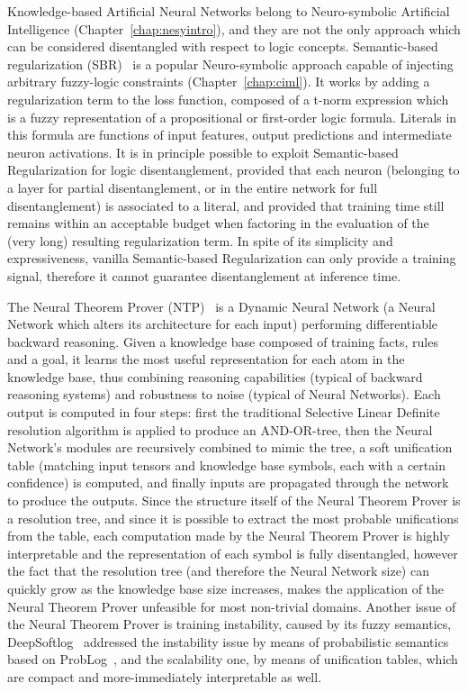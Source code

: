 Knowledge-based Artificial Neural Networks belong to Neuro-symbolic Artificial Intelligence (Chapter~\ref{chap:nesyintro}), and they are not the only approach which can be considered disentangled with respect to logic concepts.
%
Semantic-based regularization (SBR)~\cite{diligenti2017semantic} is a popular Neuro-symbolic approach capable of injecting arbitrary fuzzy-logic constraints (Chapter~\ref{chap:ciml}). It works by adding a regularization term to the loss function, composed of a t-norm expression which is a fuzzy representation of a propositional or first-order logic formula. Literals in this formula are functions of input features, output predictions and intermediate neuron activations. It is in principle possible to exploit Semantic-based Regularization for logic disentanglement, provided that each neuron (belonging to a layer for partial disentanglement, or in the entire network for full disentanglement) is associated to a literal, and provided that training time still remains within an acceptable budget when factoring in the evaluation of the (very long) resulting regularization term.
In spite of its simplicity and expressiveness, vanilla Semantic-based Regularization can only provide a training signal, therefore it cannot guarantee disentanglement at inference time. %

The Neural Theorem Prover (NTP)~\cite{rocktaschel2016learning} is a Dynamic Neural Network (a Neural Network which alters its architecture for each input) performing differentiable backward reasoning. Given a knowledge base composed of training facts, rules and a goal, it learns the most useful representation for each atom in the knowledge base, thus combining reasoning capabilities (typical of backward reasoning systems) and robustness to noise (typical of Neural Networks). Each output is computed in four steps: first the traditional Selective Linear Definite resolution algorithm is applied to produce an AND-OR-tree, then the Neural Network's modules are recursively combined to mimic the tree, a soft unification table (matching input tensors and knowledge base symbols, each with a certain confidence) is computed, and finally inputs are propagated through the network to produce the outputs. Since the structure itself of the Neural Theorem Prover is a resolution tree, and since it is possible to extract the most probable unifications from the table, each computation made by the Neural Theorem Prover is highly interpretable and the representation of each symbol is fully disentangled, however the fact that the resolution tree (and therefore the Neural Network size) can quickly grow as the knowledge base size increases, makes the application of the Neural Theorem Prover unfeasible for most non-trivial domains. Another issue of the Neural Theorem Prover is training instability, caused by its fuzzy semantics, DeepSoftlog~\cite{maene2024soft} addressed the instability issue by means of probabilistic semantics based on ProbLog~\cite{de2007problog}, and the scalability one, by means of unification tables, which are compact and more-immediately interpretable as well.

